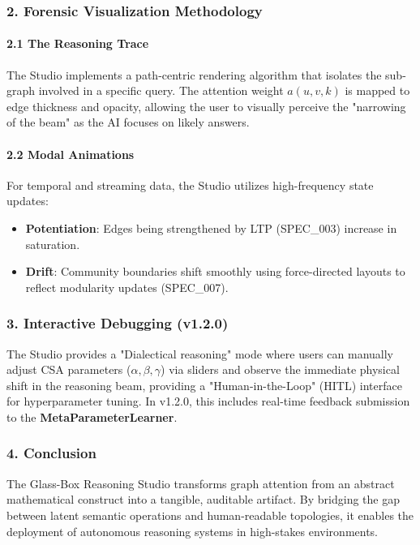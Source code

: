 \subsubsection{2. Forensic Visual\-ization Methodology}

\paragraph{2.1 The Reasoning Trace}
The Studio implements a path-centric rendering algorithm that isolates the sub-graph involved in a specific query. The attention weight $a(u,v,k)$ is mapped to edge thickness and opacity, allowing the user to visually perceive the "narrowing of the beam" as the AI focuses on likely answers.

\paragraph{2.2 Modal Animations}
For temporal and streaming data, the Studio utilizes high-frequency state updates:
\begin{itemize}
\item \textbf{Potent\-iation}: Edges being stren\-gthened by LTP (SPEC\_003) increase in saturation.
\item \textbf{Drift}: Community boundaries shift smoothly using force-directed layouts to reflect modularity updates (SPEC\_007).

\end{itemize}
\subsubsection{3. Interactive Debugging (v1.2.0)}
The Studio provides a "Dialectical reasoning" mode where users can manually adjust CSA parameters ($\alpha, \beta, \gamma$) via sliders and observe the immediate physical shift in the reasoning beam, providing a "Human-in-the-Loop" (HITL) interface for hyper\-parameter tuning. In v1.2.0, this includes real-time feedback submission to the \textbf{MetaParameterLearner}.

\subsubsection{4. Conclusion}
The Glass-Box Reasoning Studio transforms graph attention from an abstract mathe\-matical construct into a tangible, auditable artifact. By bridging the gap between latent semantic operations and human-readable topologies, it enables the deployment of autonomous reasoning systems in high-stakes envir\-onments.

